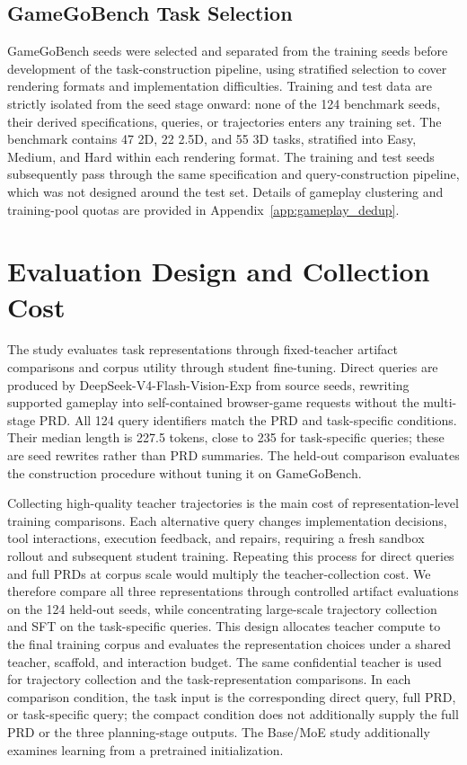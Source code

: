 \documentclass{article}
\begin{document}
\subsection{GameGoBench Task Selection}
\label{app:benchmark_split}

GameGoBench seeds were selected and separated from the training seeds before development of the task-construction pipeline, using stratified selection to cover rendering formats and implementation difficulties. Training and test data are strictly isolated from the seed stage onward: none of the 124 benchmark seeds, their derived specifications, queries, or trajectories enters any training set. The benchmark contains 47 2D, 22 2.5D, and 55 3D tasks, stratified into Easy, Medium, and Hard within each rendering format. The training and test seeds subsequently pass through the same specification and query-construction pipeline, which was not designed around the test set. Details of gameplay clustering and training-pool quotas are provided in Appendix~\ref{app:gameplay_dedup}.


\section{Evaluation Design and Collection Cost}
\label{app:evaluation_design}

The study evaluates task representations through fixed-teacher artifact comparisons and corpus utility through student fine-tuning. Direct queries are produced by DeepSeek-V4-Flash-Vision-Exp from source seeds, rewriting supported gameplay into self-contained browser-game requests without the multi-stage PRD. All 124 query identifiers match the PRD and task-specific conditions. Their median length is 227.5 tokens, close to 235 for task-specific queries; these are seed rewrites rather than PRD summaries. The held-out comparison evaluates the construction procedure without tuning it on GameGoBench.

Collecting high-quality teacher trajectories is the main cost of representation-level training comparisons. Each alternative query changes implementation decisions, tool interactions, execution feedback, and repairs, requiring a fresh sandbox rollout and subsequent student training. Repeating this process for direct queries and full PRDs at corpus scale would multiply the teacher-collection cost. We therefore compare all three representations through controlled artifact evaluations on the 124 held-out seeds, while concentrating large-scale trajectory collection and SFT on the task-specific queries. This design allocates teacher compute to the final training corpus and evaluates the representation choices under a shared teacher, scaffold, and interaction budget. The same confidential teacher is used for trajectory collection and the task-representation comparisons. In each comparison condition, the task input is the corresponding direct query, full PRD, or task-specific query; the compact condition does not additionally supply the full PRD or the three planning-stage outputs. The Base/MoE study additionally examines learning from a pretrained initialization.
\end{document}

